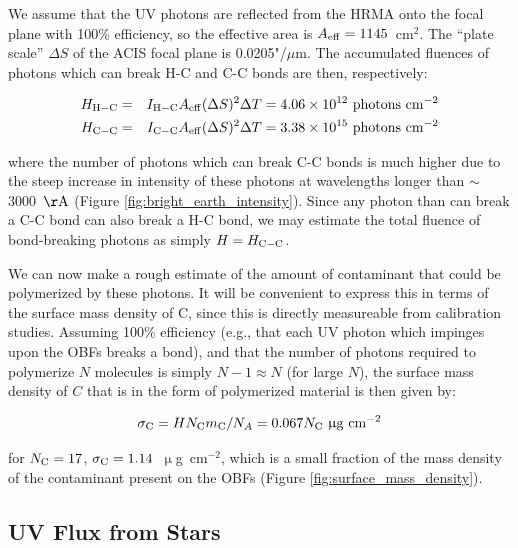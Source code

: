 \documentclass[11pt]{article}
\begin{document}
We assume that the UV photons are reflected from the HRMA onto the focal plane with 100\% efficiency,
so the effective area is $A_{\rm eff} = 1145$~cm$^2$. The ``plate scale'' $\Delta{S}$ of the ACIS focal plane is
0.0205"/$\mu$m. The accumulated fluences of photons which can break H-C and C-C bonds are then, respectively:

\begin{eqnarray}
H_{\rm H-C} &=& I_{\rm H-C}A_{\rm eff}(\Delta{S})^2\Delta{T} = 4.06 \times 10^{12}~{\rm photons~cm^{-2}} \\
H_{\rm C-C} &=& I_{\rm C-C}A_{\rm eff}(\Delta{S})^2\Delta{T} = 3.38 \times 10^{15}~{\rm photons~cm^{-2}}\label{eqn:fluence}
\end{eqnarray}

\noindent
where the number of photons which can break C-C bonds is much higher due to the steep increase in intensity of these photons at wavelengths longer than $\sim$3000~${\rm \AA}$ (Figure \ref{fig:bright_earth_intensity}). Since any photon than can break a C-C bond can also break a H-C bond, we may estimate the total fluence of bond-breaking photons as simply $H = H_{\rm C-C}$.

We can now make a rough estimate of the amount of contaminant that could be polymerized by these photons. It
will be convenient to express this in terms of the surface mass density of C, since this is directly
measureable from calibration studies. Assuming 100\% efficiency (e.g., that each UV photon which impinges upon the OBFs breaks a bond), and that the number of photons required to polymerize $N$ molecules is simply $N-1 \approx N$ (for large $N$), the surface mass density of $C$ that is in the form of polymerized material is then given by:

\begin{equation}\label{eqn:pred_poly}
\sigma_{\rm C} = HN_{\rm C}m_{\rm C}/N_A = 0.067N_{\rm C}~\upmu{\rm g~cm}^{-2}
\end{equation}

\noindent
for $N_{\rm C} = 17$, $\sigma_{\rm C} = 1.14$~$\upmu$g~cm$^{-2}$, which is a small fraction of the mass density
of the contaminant present on the OBFs (Figure \ref{fig:surface_mass_density}).

\subsection{UV Flux from Stars}
\end{document}
